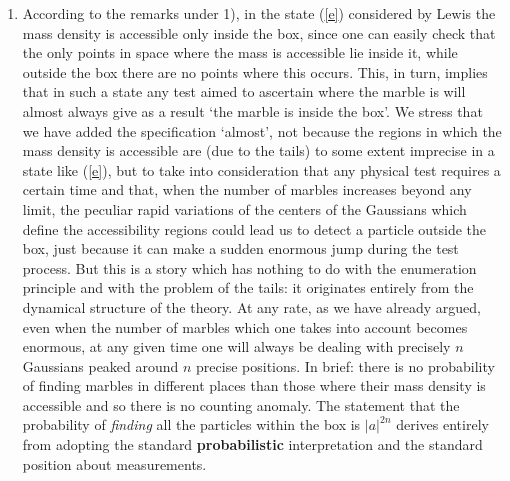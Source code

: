 \documentclass[12pt]{article}
\begin{document}
\begin{enumerate}
\item According to the remarks under 1), in the state (\ref{e})
considered by Lewis the mass density is accessible only inside the
box, since one can easily check that the only points in space
where the mass is accessible lie inside it, while outside the box
there are no points where this occurs. This, in turn, implies that
in such a state any test aimed to ascertain where the marble is
will almost always give as a result `the marble is inside the
box'. We stress that we have added the specification `almost', not
because the regions in which the mass density is accessible are
(due to the tails) to some extent imprecise in a state like
(\ref{e}), but to take into consideration that any physical test
requires a certain time and that, when the number of marbles
increases beyond any limit, the peculiar rapid variations of the
centers of the Gaussians which define the accessibility regions
could lead us  to detect a particle outside the box, just because
it can make a sudden enormous jump during the test process. But
this is a story which has nothing to do with the enumeration
principle and with the problem of the tails: it originates
entirely from the dynamical structure of the theory. At any rate,
as we have already argued, even when the number of marbles which
one takes into account becomes enormous, at any given time one
will always be dealing with precisely $n$ Gaussians peaked around
$n$ precise positions. In brief: there is no probability of
finding marbles in different places than those where their mass
density is accessible and so there is no counting anomaly. The
statement that the probability of {\it finding} all the particles
within the box is $|a|^{2n}$ derives entirely from adopting the
standard {\bf probabilistic} interpretation and the standard
position about measurements.


\end{enumerate}
\end{document}
